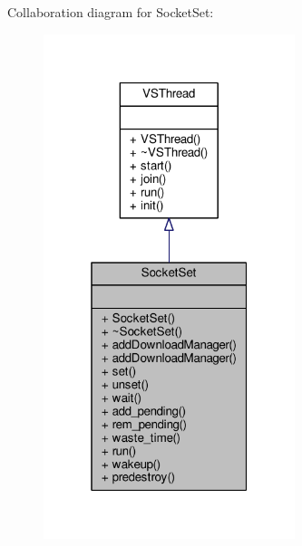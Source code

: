 Collaboration diagram for Socket\+Set\+:
\nopagebreak
\begin{figure}[H]
\begin{center}
\leavevmode
\includegraphics[width=208pt]{da/dfa/classSocketSet__coll__graph}
\end{center}
\end{figure}
